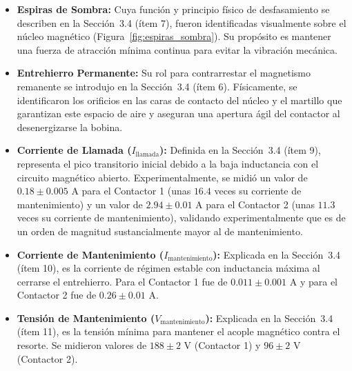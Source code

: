 \begin{itemize}
    \item \textbf{Espiras de Sombra:} Cuya función y principio físico de desfasamiento se describen en la Sección~3.4 (ítem 7), fueron identificadas visualmente sobre el núcleo magnético (Figura~\ref{fig:espiras_sombra}). Su propósito es mantener una fuerza de atracción mínima continua para evitar la vibración mecánica.
    \item \textbf{Entrehierro Permanente:} Su rol para contrarrestar el magnetismo remanente se introdujo en la Sección~3.4 (ítem 6). Físicamente, se identificaron los orificios en las caras de contacto del núcleo y el martillo que garantizan este espacio de aire y aseguran una apertura ágil del contactor al desenergizarse la bobina.
    \item \textbf{Corriente de Llamada ($I_{\text{llamada}}$):} Definida en la Sección~3.4 (ítem 9), representa el pico transitorio inicial debido a la baja inductancia con el circuito magnético abierto. Experimentalmente, se midió un valor de $\num{0,18} \pm \num{0,005}$ \si{\ampere} para el Contactor 1 (unas $\num{16,4}$ veces su corriente de mantenimiento) y un valor de $\num{2,94} \pm \num{0,01}$ \si{\ampere} para el Contactor 2 (unas $\num{11,3}$ veces su corriente de mantenimiento), validando experimentalmente que es de un orden de magnitud sustancialmente mayor al de mantenimiento.
    \item \textbf{Corriente de Mantenimiento ($I_{\text{mantenimiento}}$):} Explicada en la Sección~3.4 (ítem 10), es la corriente de régimen estable con inductancia máxima al cerrarse el entrehierro. Para el Contactor 1 fue de $\num{0,011} \pm \num{0,001}$ \si{\ampere} y para el Contactor 2 fue de $\num{0,26} \pm \num{0,01}$ \si{\ampere}.
    \item \textbf{Tensión de Mantenimiento ($V_{\text{mantenimiento}}$):} Explicada en la Sección~3.4 (ítem 11), es la tensión mínima para mantener el acople magnético contra el resorte. Se midieron valores de $\num{188} \pm \num{2}$ \si{\volt} (Contactor 1) y $\num{96} \pm \num{2}$ \si{\volt} (Contactor 2).
\end{itemize}
